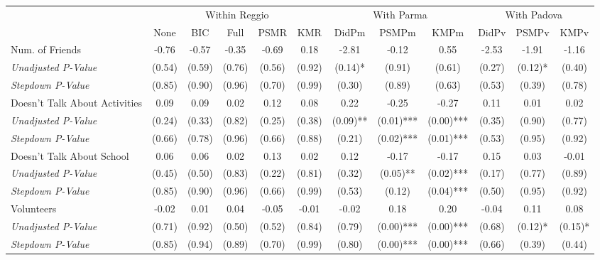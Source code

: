 \begin{tabular}{l c c c c c c c c c c c}
\toprule
& \multicolumn{5}{c}{Within Reggio} & \multicolumn{3}{c}{With Parma} & \multicolumn{3}{c}{With Padova} \\\cmidrule(lr){2-6} \cmidrule(lr){7-9} \cmidrule(lr){10-12}
 & None & BIC & Full & PSMR & KMR & DidPm & PSMPm & KMPm & DidPv & PSMPv & KMPv \\
\midrule
Num. of Friends & -0.76 & -0.57 & -0.35 & -0.69 & 0.18 & -2.81 & -0.12 & 0.55 & -2.53 & -1.91 & -1.16 \\
\quad \textit{Unadjusted P-Value} & (0.54) & (0.59) & (0.76) & (0.56) & (0.92) & (0.14)* & (0.91) & (0.61) & (0.27) & (0.12)* & (0.40) \\
\quad \textit{Stepdown P-Value} & (0.85) & (0.90) & (0.96) & (0.70) & (0.99) & (0.30) & (0.89) & (0.63) & (0.53) & (0.39) & (0.78) \\
Doesn't Talk About Activities & 0.09 & 0.09 & 0.02 & 0.12 & 0.08 & 0.22 & -0.25 & -0.27 & 0.11 & 0.01 & 0.02 \\
\quad \textit{Unadjusted P-Value} & (0.24) & (0.33) & (0.82) & (0.25) & (0.38) & (0.09)** & (0.01)*** & (0.00)*** & (0.35) & (0.90) & (0.77) \\
\quad \textit{Stepdown P-Value} & (0.66) & (0.78) & (0.96) & (0.66) & (0.88) & (0.21) & (0.02)*** & (0.01)*** & (0.53) & (0.95) & (0.92) \\
Doesn't Talk About School & 0.06 & 0.06 & 0.02 & 0.13 & 0.02 & 0.12 & -0.17 & -0.17 & 0.15 & 0.03 & -0.01 \\
\quad \textit{Unadjusted P-Value} & (0.45) & (0.50) & (0.83) & (0.22) & (0.81) & (0.32) & (0.05)** & (0.02)*** & (0.17) & (0.77) & (0.89) \\
\quad \textit{Stepdown P-Value} & (0.85) & (0.90) & (0.96) & (0.66) & (0.99) & (0.53) & (0.12) & (0.04)*** & (0.50) & (0.95) & (0.92) \\
Volunteers & -0.02 & 0.01 & 0.04 & -0.05 & -0.01 & -0.02 & 0.18 & 0.20 & -0.04 & 0.11 & 0.08 \\
\quad \textit{Unadjusted P-Value} & (0.71) & (0.92) & (0.50) & (0.52) & (0.84) & (0.79) & (0.00)*** & (0.00)*** & (0.68) & (0.12)* & (0.15)* \\
\quad \textit{Stepdown P-Value} & (0.85) & (0.94) & (0.89) & (0.70) & (0.99) & (0.80) & (0.00)*** & (0.00)*** & (0.66) & (0.39) & (0.44) \\
\bottomrule
\end{tabular}
